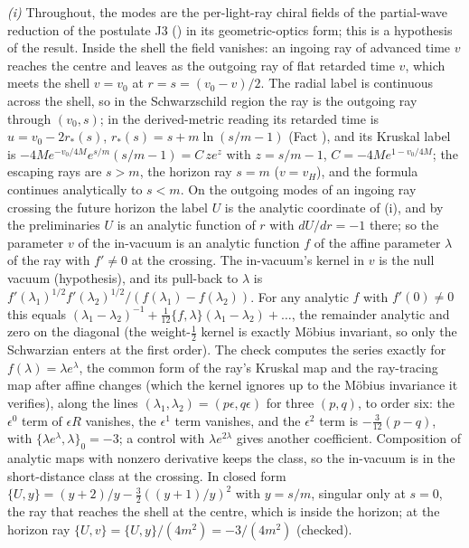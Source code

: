 \emph{(i)} Throughout, the modes are the per-light-ray chiral fields of the partial-wave reduction of the postulate J3 () in its geometric-optics form; this is a hypothesis of the result. Inside the shell the field vanishes: an ingoing ray of advanced time $v$ reaches the centre and leaves as the outgoing ray of flat retarded time $v$, which meets the shell $v = v_{0}$ at $r = s = (v_{0} - v)/2$. The radial label is continuous across the shell, so in the Schwarzschild region the ray is the outgoing ray through $(v_{0}, s)$; in the derived-metric reading its retarded time is $u = v_{0} - 2r_{*}(s)$, $r_{*}(s) = s + m\ln(s/m - 1)$ (Fact ), and its Kruskal label is $-4M e^{-v_{0}/4M}e^{s/m}(s/m - 1) = C\,z e^{z}$ with $z = s/m - 1$, $C = -4Me^{1 - v_{0}/4M}$; the escaping rays are $s > m$, the horizon ray $s = m$ ($v = v_{H}$), and the formula continues analytically to $s < m$. On the outgoing modes of an ingoing ray crossing the future horizon the label $U$ is the analytic coordinate of (i), and by the preliminaries $U$ is an analytic function of $r$ with $dU/dr = -1$ there; so the parameter $v$ of the in-vacuum is an analytic function $f$ of the affine parameter $\lambda$ of the ray with $f' \ne 0$ at the crossing. The in-vacuum's kernel in $v$ is the null vacuum (hypothesis), and its pull-back to $\lambda$ is $f'(\lambda_{1})^{1/2}f'(\lambda_{2})^{1/2}/(f(\lambda_{1}) - f(\lambda_{2}))$. For any analytic $f$ with $f'(0) \ne 0$ this equals $(\lambda_{1} - \lambda_{2})^{-1} + \tfrac{1}{12}\{f, \lambda\}(\lambda_{1} - \lambda_{2}) + \dots$, the remainder analytic and zero on the diagonal (the weight-$\tfrac12$ kernel is exactly M\"obius invariant, so only the Schwarzian enters at the first order). The check computes the series exactly for $f(\lambda) = \lambda e^{\lambda}$, the common form of the ray's Kruskal map and the ray-tracing map after affine changes (which the kernel ignores up to the M\"obius invariance it verifies), along the lines $(\lambda_{1}, \lambda_{2}) = (p\epsilon, q\epsilon)$ for three $(p, q)$, to order six: the $\epsilon^{0}$ term of $\epsilon R$ vanishes, the $\epsilon^{1}$ term vanishes, and the $\epsilon^{2}$ term is $-\tfrac{3}{12}(p - q)$, with $\{\lambda e^{\lambda}, \lambda\}_{0} = -3$; a control with $\lambda e^{2\lambda}$ gives another coefficient. Composition of analytic maps with nonzero derivative keeps the class, so the in-vacuum is in the short-distance class at the crossing. In closed form $\{U, y\} = (y + 2)/y - \tfrac32((y + 1)/y)^{2}$ with $y = s/m$, singular only at $s = 0$, the ray that reaches the shell at the centre, which is inside the horizon; at the horizon ray $\{U, v\} = \{U, y\}/(4m^{2}) = -3/(4m^{2})$ (checked).

